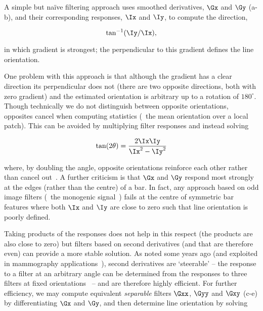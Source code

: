 A simple but na\"ive filtering approach uses smoothed derivatives, $\Gx$ and $\Gy$ (a-b), and their corresponding responses, $\Ix$ and $\Iy$, to compute the direction,

\begin{equation}
\tan^{-1}(\Iy/\Ix),
\label{e:1d}
\end{equation}

\noindent in which gradient is strongest; the perpendicular to this gradient defines the line orientation.


One problem with this approach is that although the gradient has a clear direction its perpendicular does not (there are two opposite directions, both with zero gradient) and the estimated orientation is arbitrary up to a rotation of $180^\circ$. Though technically we do not distinguish between opposite orientations, opposites cancel when computing statistics (\eg~the mean orientation over a local patch). This can be avoided by multiplying filter responses and instead solving

\begin{equation}
\tan(2\theta) = \frac{2\Ix\Iy}{\Ix^2-\Iy^2}
\label{e:1dsqr}
\end{equation}

\noindent where, by doubling the angle, opposite orientations reinforce each other rather than cancel out~\cite{Mardia_Jupp_00}. A further criticism is that $\Gx$ and $\Gy$ respond most strongly at the edges (rather than the centre) of a bar. In fact, any approach based on odd image filters (\eg~the monogenic signal~\cite{Felsberg_Sommer_TSP01}) fails at the centre of symmetric bar features where both $\Ix$ and $\Iy$ are close to zero such that line orientation is poorly defined.

Taking products of the responses does not help in this respect (the products are also close to zero) but filters based on second derivatives (and that are therefore even) can provide a more stable solution. As noted some years ago (and exploited in mammography applications~\cite{Karssemeijer_teBrake_TMI96}), second derivatives are `steerable' -- the response to a filter at an arbitrary angle can be determined from the responses to three filters at fixed orientations~\cite{Freeman_Adelson_TPAMI91,Koenderink_vanDoorn_TPAMI92} -- and are therefore highly efficient. For further efficiency, we may compute equivalent \emph{separable} filters $\Gxx$, $\Gyy$ and $\Gxy$ (c-e) by differentiating $\Gx$ and $\Gy$, and then determine line orientation by solving

